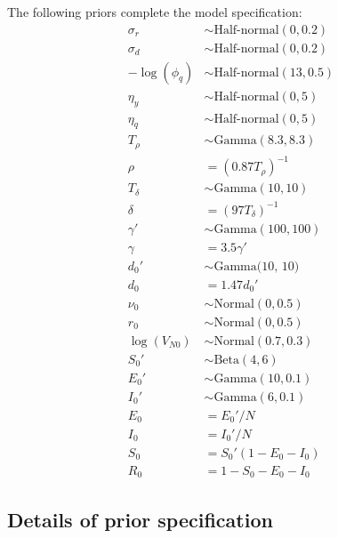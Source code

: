 \documentclass[12pt,letterpaper]{article}
\begin{document}
The following priors complete the model specification:
\begin{align}
\sigma_r & \sim \text{Half-normal}(0, 0.2)\\
\sigma_d & \sim \text{Half-normal}(0, 0.2)\\
-\log(\phi_q) & \sim \text{Half-normal}(13, 0.5)\\
\eta_y &\sim \text{Half-normal}(0, 5)\\
\eta_q & \sim \text{Half-normal}(0, 5)\\
T_{\rho} & \sim \text{Gamma}(8.3, 8.3)\\
\rho & = (0.87 T_{\rho})^{-1}\\
T_{\delta} & \sim \text{Gamma}(10, 10)\\
\delta & = (97 T_{\delta})^{-1}\\
\gamma' & \sim \text{Gamma}(100, 100)\\
\gamma & = 3.5\gamma'\\
d_0' & \sim \text{Gamma(10, 10)}\\
d_0 & = 1.47 d_0'\\
\nu_0 & \sim \text{Normal}(0, 0.5)\\
r_0 & \sim \text{Normal}(0, 0.5)\\
\log(V_{N0}) & \sim \text{Normal}(0.7, 0.3) \\ 
S_0' & \sim \text{Beta}(4, 6)\\
E_0' & \sim \text{Gamma}(10, 0.1)\\
I_0' & \sim \text{Gamma}(6, 0.1)\\
E_0 & = E_0' / N \\
I_0 & = I_0' / N \\ 
S_0 & = S_0'(1 - E_0 - I_0) \\
R_0 & = 1 - S_0 - E_0 - I_0
\end{align}

\subsection*{Details of prior specification}
\end{document}
